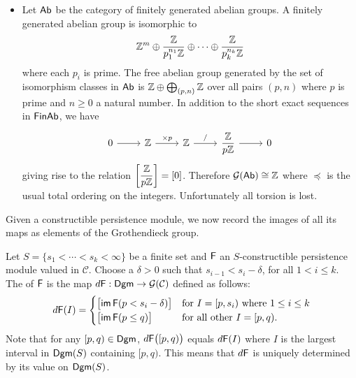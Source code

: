 \documentclass[12pt]{article}
\begin{document}
\begin{ex}
\begin{itemize}
	\item
	Let ${\mathsf{Ab}}$ be the category of finitely generated abelian groups.
	A finitely generated abelian group is isomorphic to
		$$ {\mathbb Z}^m \oplus \dfrac{{\mathbb Z}}{p_1^{n_1} {\mathbb Z}} \oplus \cdots \oplus
		 			\dfrac{{\mathbb Z}}{p_k^{n_k} {\mathbb Z}}$$
	where each $p_i$ is prime.
	The free abelian group generated by the set of isomorphism classes in ${\mathsf{Ab}}$
	is ${\mathbb Z} \oplus \bigoplus_{(p,n)} {\mathbb Z}$
	over all pairs $(p, n)$ where $p$ is prime and $n \geq 0$ a natural number.
	In addition to the short exact sequences in ${\mathsf{FinAb}}$, we have
		\begin{equation*}
		\begin{tikzcd}
		0 \arrow[r] & \Zspace \arrow[r, "\times p"] & 
		\Zspace \arrow[r, "/"] &
		\dfrac{\Zspace}{p\Zspace} \arrow[r] & 0
		\end{tikzcd}
		\end{equation*}
	giving rise to the relation $\left[ \dfrac{{\mathbb Z}}{p {\mathbb Z}} \right] = [0]$.
	Therefore ${\mathcal{G}}( {\mathsf{Ab}}) \cong {\mathbb Z}$ where $\preceq$ is the usual total ordering on the integers.
	Unfortunately all torsion is lost.
	\end{itemize}
\end{ex}


Given a constructible persistence module, we now record the images of all its maps
as elements of the Grothendieck group.

\begin{defn}
Let $S = \{s_1 < \cdots < s_k < \infty\}$ be a finite set and ${\mathsf{F}}$ an 
$S$-constructible persistence module valued in $\mathcal{C}$.
Choose a $\delta > 0$ such that $s_{i-1} < s_i - \delta$, for all $1< i \leq k$.
The  of ${\mathsf{F}}$ is the map
$d {\mathsf{F}} : {\mathsf{Dgm}} \to {\mathcal{G}}( \mathcal{C} )$ defined as follows:
$$d {\mathsf{F}} (I) =
\begin{cases}
\big[ \mathsf{im} \, {\mathsf{F}}(p<s_i-\delta) \big]	& \text{for } I = [p,s_i) \text{ where } 1 \leq i \leq k \\
\big[ \mathsf{im} \, {\mathsf{F}}(p \leq q) \big]	& \text{for all other } I=[p,q).
\end{cases}
$$
Note that for any $[p,q) \in {\mathsf{Dgm}}$, $d {\mathsf{F}} \big ( [p,q) \big)$ equals
$d {\mathsf{F}}(I)$ where $I$ is the largest interval in ${\mathsf{Dgm}}(S)$ containing $[p,q)$.
This means that $d {\mathsf{F}}$ is uniquely determined by its value on ${\mathsf{Dgm}}(S)$.
\end{defn}
\end{document}
